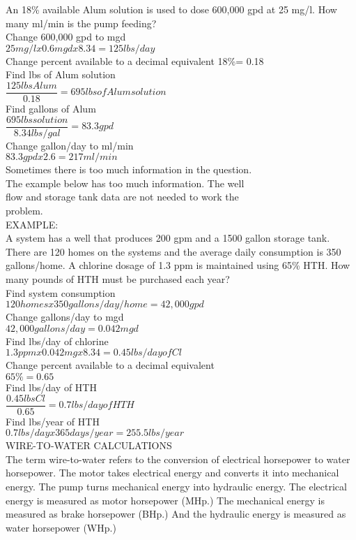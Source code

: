 \documentclass{article}
\begin{document}
An 18\% available Alum solution is used to dose 600,000 gpd at 25 mg/l. How many ml/min is the pump feeding?\\
Change 600,000 gpd to mgd\\
$25 mg/l x 0.6 mgd x 8.34 = 125 lbs/day$\\
Change percent available to a decimal equivalent 18\%= 0.18\\
Find lbs of Alum solution\\
$\dfrac{125 lbs Alum}{0.18} = 695 lbs of Alum solution$\\
Find gallons of Alum\\
$\dfrac{695 lbs solution}{8.34 lbs/gal} = 83.3 gpd$\\
Change gallon/day to ml/min\\
$83.3 gpd x 2.6 = 217 ml/min$\\
Sometimes there is too much information in the question.\\
The example below has too much information. The well\\
flow and storage tank data are not needed to work the\\
problem.\\
EXAMPLE:\\
A system has a well that produces 200 gpm and a 1500 gallon storage tank. There are 120 homes on the systems and the average daily consumption is 350 gallons/home. A chlorine dosage of 1.3 ppm is maintained using 65\% HTH. How many pounds of HTH must be purchased each year?\\
Find system consumption\\
$120 homes x 350 gallons/day/home = 42,000 gpd$\\
Change gallons/day to mgd\\
$42,000 gallons/day = 0.042 mgd$\\
Find lbs/day of chlorine\\
$1.3 ppm x 0.042 mg x 8.34 = 0.45 lbs/day of Cl$\\
Change percent available to a decimal equivalent\\
$65\% = 0.65$\\
Find lbs/day of HTH\\
$\dfrac{0.45 lbs Cl}{ 0.65}= 0.7 lbs/day of HTH$\\
Find lbs/year of HTH\\
$0.7 lbs/day x 365 days/year = 255.5 lbs/year$\\
WIRE-TO-WATER CALCULATIONS\\
The term wire-to-water refers to the conversion of electrical horsepower to water horsepower. The motor takes electrical energy and converts it into mechanical energy. The pump turns mechanical energy into hydraulic energy. The electrical energy is measured as motor horsepower (MHp.) The mechanical energy is measured as brake horsepower (BHp.) And the hydraulic energy is measured as water horsepower (WHp.)\\
\end{document}
